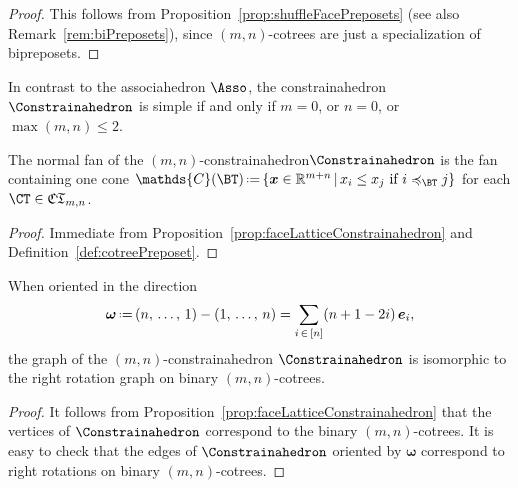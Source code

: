 \documentclass[AHL,Unicode,longabstracts,published]{cedram}
\newcommand{\R}{\mathbb{R}}
\renewcommand{\b}[1]{\boldsymbol{#1}}
\newcommand{\f}[1]{\mathfrak{#1}}
\newcommand{\eqdef}{\mbox{\,\raisebox{0.2ex}{\scriptsize\ensuremath{\mathrm:}}\ensuremath{=}\,}}
\newcommand{\polytope}[1]{\mathds{#1}}
\begin{document}
\begin{proof}
This follows from Proposition~\ref{prop:shuffleFacePreposets} (see also Remark~\ref{rem:biPreposets}), since $(m,n)$-cotrees are just a specialization of bipreposets.
\end{proof}

\begin{rema}\label{rem:simpleConstrainahedron}
In contrast to the associahedron $\Asso$, the constrainahedron $\Constrainahedron$ is simple if and only if $m = 0$, or $n = 0$, or $\max(m,n) \le 2$.
\end{rema}

\begin{prop}\label{prop:fanConstrainahedron}
The normal fan of the $(m,n)$-constrainahedron\linebreak ${\Constrainahedron}$ is the fan containing one cone $\polytope{C}(\BT) \eqdef \{\b{x} \in \R^{m+n}\,|\,x_i \le x_j \text{ if } i \preccurlyeq_{\BT} j\}$ for each ${\CT \in \f{CT}_{m,n}}$.
\end{prop}

\begin{proof}
Immediate from Proposition~\ref{prop:faceLatticeConstrainahedron} and Definition~\ref{def:cotreePreposet}.
\end{proof}

\begin{prop}\label{prop:graphConstrainahedron}
When oriented in the direction
\[
{\b{\omega} \eqdef (n,\,\dots,\,1) - (1,\,\dots,\,n) = \sum_{i\,\in\,[n]} (n+1-2i) \, \b{e}_i},
\]
the graph of the $(m,n)$-constrainahedron ${\Constrainahedron}$ is isomorphic to the right rotation graph on binary $(m,n)$-cotrees.
\end{prop}

\begin{proof}
It follows from Proposition~\ref{prop:faceLatticeConstrainahedron} that the vertices of $\Constrainahedron$ correspond to the binary $(m,n)$-cotrees. It is easy to check that the edges of $\Constrainahedron$ oriented by $\b{\omega}$ correspond to right rotations on binary $(m,n)$-cotrees.
\end{proof}
\end{document}
